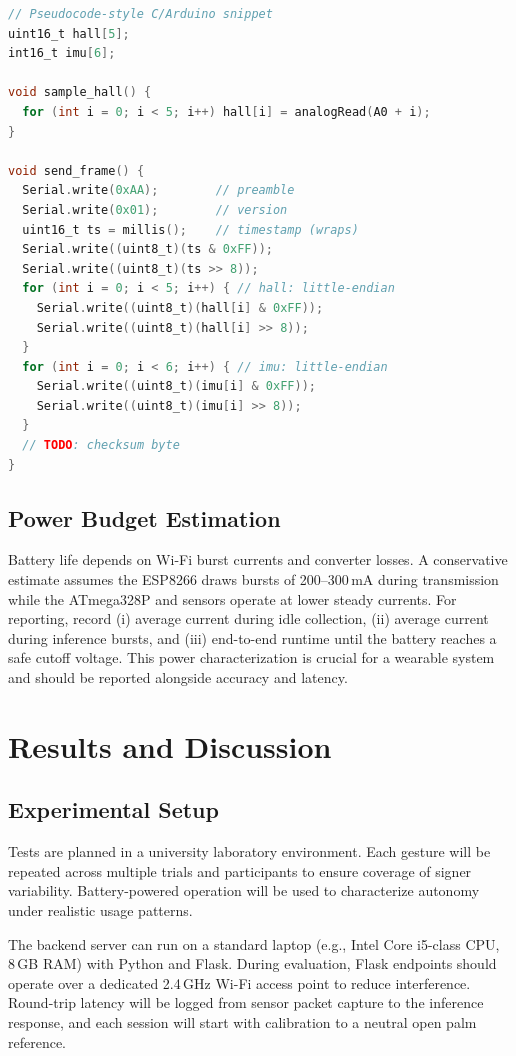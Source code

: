 \documentclass[conference]{IEEEtran}
\begin{document}
\begin{lstlisting}[style=sslgcode, caption={ATmega328P sampling and UART packet framing (illustrative).}, label={lst:firmware_pack}, language=C]
// Pseudocode-style C/Arduino snippet
uint16_t hall[5];
int16_t imu[6];

void sample_hall() {
  for (int i = 0; i < 5; i++) hall[i] = analogRead(A0 + i);
}

void send_frame() {
  Serial.write(0xAA);        // preamble
  Serial.write(0x01);        // version
  uint16_t ts = millis();    // timestamp (wraps)
  Serial.write((uint8_t)(ts & 0xFF));
  Serial.write((uint8_t)(ts >> 8));
  for (int i = 0; i < 5; i++) { // hall: little-endian
    Serial.write((uint8_t)(hall[i] & 0xFF));
    Serial.write((uint8_t)(hall[i] >> 8));
  }
  for (int i = 0; i < 6; i++) { // imu: little-endian
    Serial.write((uint8_t)(imu[i] & 0xFF));
    Serial.write((uint8_t)(imu[i] >> 8));
  }
  // TODO: checksum byte
}
\end{lstlisting}

\subsection{Power Budget Estimation}
Battery life depends on Wi-Fi burst currents and converter losses. A conservative estimate assumes the ESP8266 draws bursts of 200--300\,mA during transmission while the ATmega328P and sensors operate at lower steady currents. For reporting, record (i) average current during idle collection, (ii) average current during inference bursts, and (iii) end-to-end runtime until the battery reaches a safe cutoff voltage. This power characterization is crucial for a wearable system and should be reported alongside accuracy and latency.

\section{Results and Discussion}
\subsection{Experimental Setup}
Tests are planned in a university laboratory environment. Each gesture will be repeated across multiple trials and participants to ensure coverage of signer variability. Battery-powered operation will be used to characterize autonomy under realistic usage patterns.

The backend server can run on a standard laptop (e.g., Intel Core i5-class CPU, 8\,GB RAM) with Python and Flask. During evaluation, Flask endpoints should operate over a dedicated 2.4\,GHz Wi-Fi access point to reduce interference. Round-trip latency will be logged from sensor packet capture to the inference response, and each session will start with calibration to a neutral open palm reference.
\end{document}
